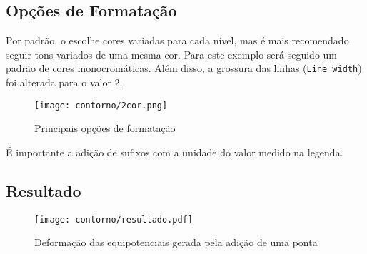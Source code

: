 \subsection{Opções de Formatação}

    Por padrão, o \software escolhe cores variadas para cada nível, mas é mais recomendado seguir tons variados de uma mesma cor. Para este exemplo será seguido um padrão de cores monocromáticas. Além disso, a grossura das linhas (\texttt{Line width}) foi alterada para o valor 2.

    \begin{figure}[htbp]
        \centering
        \texttt{[image: contorno/2cor.png]}

        \caption{Principais opções de formatação}
        \label{fig:contorno:cor}
    \end{figure}

    \begin{lembrete}
        É importante a adição de sufixos com a unidade do valor medido na legenda.
    \end{lembrete}


\subsection{Resultado}

    \begin{figure}[htbp]
        \centering
        \texttt{[image: contorno/resultado.pdf]}

        \caption{Deformação das equipotenciais gerada pela adição de uma ponta}
        \label{fig:contorno:final}
    \end{figure}

